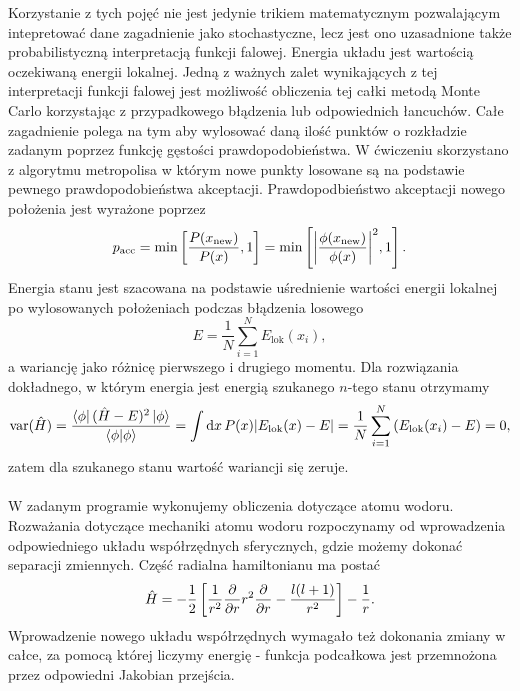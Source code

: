 \documentclass[12pt, a4paper]{article}
\begin{document}
    Korzystanie z tych pojęć nie jest jedynie trikiem matematycznym pozwalającym intepretować dane zagadnienie jako stochastyczne, lecz jest ono uzasadnione także probabilistyczną interpretacją funkcji falowej.
    Energia układu jest wartością oczekiwaną energii lokalnej.
    Jedną z ważnych zalet wynikających z tej interpretacji funkcji falowej jest możliwość obliczenia tej całki metodą Monte Carlo korzystając z przypadkowego błądzenia lub odpowiednich łancuchów.
    Całe zagadnienie polega na tym aby wylosować daną ilość punktów o rozkładzie zadanym poprzez funkcję gęstości prawdopodobieństwa.
    W ćwiczeniu skorzystano z algorytmu metropolisa w którym nowe punkty losowane są na podstawie pewnego prawdopodobieństwa akceptacji.
    Prawdopodbieństwo akceptacji nowego położenia jest wyrażone poprzez
    \begin{equation}
        p_{\text{acc}} =\min\left[\frac{P(x_{\text{new}})}{P(x)},1 \right] = \min\left[\abs{\frac{\phi(x_{\text{new}})}{\phi(x)}}^2,1 \right].
    \end{equation}
    Energia stanu jest szacowana na podstawie uśrednienie wartości energii lokalnej po wylosowanych położeniach podczas błądzenia losowego
    \begin{equation}
        E = \frac{1}{N} \sum_{i=1}^N E_{\text{lok}}(x_i),
    \end{equation}
    a wariancję jako różnicę pierwszego i drugiego momentu. Dla rozwiązania dokładnego, w którym energia jest energią szukanego $n$-tego stanu otrzymamy
    \begin{equation}
        \text{var}(\hat{H}) = \frac{\bra{\phi} (\hat{H} - E)^2 \ket{\phi}}{\bra{\phi}\ket{\phi}} =\int \dd x \, P(x) \abs{E_{\text{lok}}(x) - E} = \frac{1}{N} \sum_{i=1}^N \left( E_{\text{lok}}(x_i) - E \right) = 0,
    \end{equation}
    zatem dla szukanego stanu wartość wariancji się zeruje.
    \\
    \\
    W zadanym programie wykonujemy obliczenia dotyczące atomu wodoru.
    Rozważania dotyczące mechaniki atomu wodoru rozpoczynamy od wprowadzenia odpowiedniego układu współrzędnych sferycznych, gdzie możemy dokonać separacji zmiennych.
    Część radialna hamiltonianu ma postać
    \begin{equation}
        \hat{H} = -\frac{1}{2} \left[ \frac{1}{r^2} \pdv{r} r^2 \pdv{r} - \frac{l(l+1)}{r^2} \right] - \frac{1}{r}.
    \end{equation}
    Wprowadzenie nowego układu współrzędnych wymagało też dokonania zmiany w całce, za pomocą której liczymy energię - funkcja podcałkowa jest przemnożona przez odpowiedni Jakobian przejścia.
\end{document}
